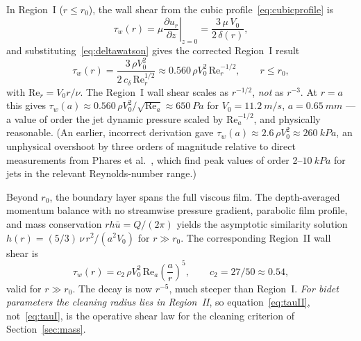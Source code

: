 \documentclass[aps,prfluids,reprint,amsmath,amssymb,floatfix]{revtex4-2}
\newcommand{\Rey}{\mathrm{Re}}
\begin{document}
In Region~I ($r \leq r_0$), the wall shear from the cubic
profile~\eqref{eq:cubicprofile} is
\begin{equation}
    \tau_w(r) = \mu\left.\frac{\partial u_r}{\partial z}\right|_{z=0}
    = \frac{3\,\mu\,V_0}{2\,\delta(r)},
    \label{eq:taudef}
\end{equation}
and substituting~\eqref{eq:deltawatson} gives the corrected Region~I result
\begin{equation}
    \boxed{
    \tau_w(r) = \frac{3\,\rho V_0^2}{2\,c_\delta\,\Rey_r^{1/2}}
    \approx 0.560\,\rho V_0^2\,\Rey_r^{-1/2},
    \qquad r \leq r_0,
    }
    \label{eq:tauI}
\end{equation}
with $\Rey_r = V_0 r/\nu$. The Region~I wall shear scales as $r^{-1/2}$,
\emph{not} as $r^{-3}$. At $r = a$ this gives
$\tau_w(a) \approx 0.560\,\rho V_0^2/\sqrt{\Rey_a} \approx \SI{650}{Pa}$
for $V_0 = \SI{11.2}{m/s}$, $a = \SI{0.65}{mm}$ --- a value of order the
jet dynamic pressure scaled by $\Rey_a^{-1/2}$, and physically
reasonable. (An earlier, incorrect derivation gave
$\tau_w(a) \approx 2.6\,\rho V_0^2 \approx \SI{260}{kPa}$, an unphysical
overshoot by three orders of magnitude relative to direct measurements
from Phares et al.~\citep{Phares2000}, which find peak values of order
2--$\SI{10}{kPa}$ for jets in the relevant Reynolds-number range.)

Beyond $r_0$, the boundary layer spans the full viscous film. The
depth-averaged momentum balance with no streamwise pressure gradient,
parabolic film profile, and mass conservation $rh\bar u = Q/(2\pi)$
yields the asymptotic similarity solution $h(r) = (5/3)\,\nu\,r^2/(a^2 V_0)$
for $r \gg r_0$. The corresponding Region~II wall shear is
\begin{equation}
    \boxed{
    \tau_w(r) = c_2\,\rho V_0^2\,\Rey_a\left(\frac{a}{r}\right)^5,
    \qquad c_2 = 27/50 \approx 0.54,
    }
    \label{eq:tauII}
\end{equation}
valid for $r \gg r_0$. The decay is now $r^{-5}$, much steeper than
Region~I. \emph{For bidet parameters the cleaning radius lies in
Region~II}, so equation~\eqref{eq:tauII}, not~\eqref{eq:tauI}, is the
operative shear law for the cleaning criterion of
Section~\ref{sec:mass}.
\end{document}
